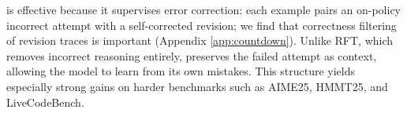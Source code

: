 \sft{} is effective because it supervises error correction: each example pairs an on-policy incorrect attempt with a self-corrected revision; we find that correctness filtering of revision traces is important (Appendix \ref{app:countdown}). Unlike RFT, which removes incorrect reasoning entirely, \sft{} preserves the failed attempt as context, allowing the model to learn from its own mistakes. This structure yields especially strong gains on harder benchmarks such as AIME25, HMMT25, and LiveCodeBench.








